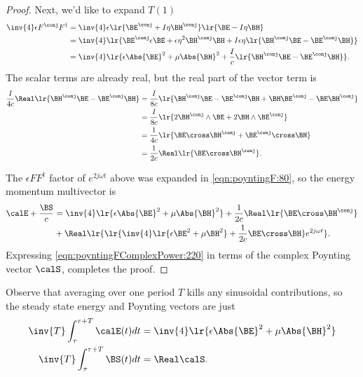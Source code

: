 \begin{proof}
Next, we'd like to expand \( T(1) \)
\begin{equation}\label{eqn:poyntingFComplexPower:80}
\begin{aligned}
\inv{4} \epsilon F^\conj F^\dagger
&=
\inv{4} \epsilon \lr{ \BE^\conj + I \eta \BH^\conj } \lr{ \BE - I \eta \BH } \\
&=
\inv{4} \lr{ \BE^\conj \epsilon \BE + \epsilon \eta^2 \BH^\conj \BH
+ I \epsilon \eta \lr{ \BH^\conj \BE - \BE^\conj \BH }
} \\
&=
\inv{4} \lr{
\epsilon \Abs{\BE}^2 + \mu \Abs{\BH}^2
+ \frac{I}{c} \lr{ \BH^\conj \BE - \BE^\conj \BH }
}.
\end{aligned}
\end{equation}
The scalar terms are already real, but the real part of the vector term is
\begin{equation}\label{eqn:poyntingFComplexPower:200}
\begin{aligned}
\frac{I}{4 c} \Real \lr{ \BH^\conj \BE - \BE^\conj \BH }
&=
\frac{I}{8 c} \lr{
\BH^\conj \BE - \BE^\conj \BH
+ \BH \BE^\conj - \BE \BH^\conj
} \\
&=
\frac{I}{8 c} \lr{
2 \BH^\conj \wedge \BE
+ 2 \BH \wedge \BE^\conj
} \\
&=
\frac{1}{4 c} \lr{
\BE \cross \BH^\conj
+ \BE^\conj \cross \BH
} \\
&=
\frac{1}{2 c} \Real \lr{
\BE \cross \BH^\conj
}.
\end{aligned}
\end{equation}

The \( \epsilon F F^\dagger \) factor of \( e^{2 j \omega t} \) above was expanded in \cref{eqn:poyntingF:80}, so the energy momentum multivector is
\begin{equation}\label{eqn:poyntingFComplexPower:220}
\begin{aligned}
\calE + \frac{\BS}{c}
&=
\inv{4} \lr{
\epsilon \Abs{\BE}^2 + \mu \Abs{\BH}^2 }
+
\frac{1}{2 c} \Real \lr{
\BE \cross \BH^\conj
} \\
&+
\Real
\lr{
   \lr{
     \inv{4} \lr{ \epsilon \BE^2 + \mu \BH^2 }
   + \frac{1}{2 c} \BE \cross \BH
   }
   e^{2 j \omega t }
}.
\end{aligned}
\end{equation}
Expressing \cref{eqn:poyntingFComplexPower:220} in terms
of the complex Poynting vector \( \calS \), completes the proof.
\end{proof}

Observe that
averaging over one period \( T \) kills any sinusoidal contributions, so the steady state energy and Poynting vectors are just
\begin{equation}\label{eqn:poyntingFComplexPower:280}
\begin{aligned}
\inv{T} \int_\tau^{\tau+T} \calE(t) dt &=
\inv{4} \lr{
\epsilon \Abs{\BE}^2 + \mu \Abs{\BH}^2 } \\
\inv{T} \int_\tau^{\tau+T} \BS(t) dt &= \Real \calS.
\end{aligned}
\end{equation}

